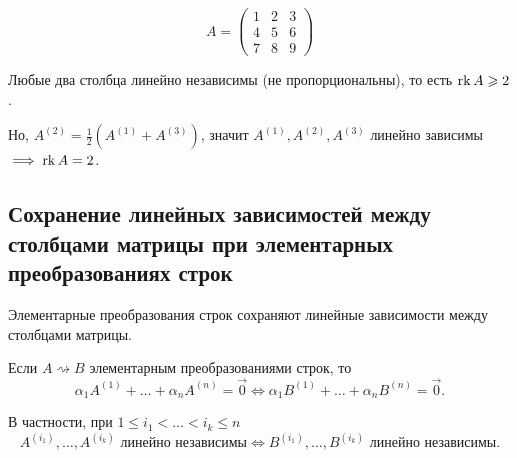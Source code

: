 \begin{example}
    \begin{equation*}
        A = \begin{pmatrix} 1 & 2 & 3 \\ 4 & 5 & 6 \\ 7 & 8 & 9 \end{pmatrix} 
    \end{equation*}
    
    Любые два столбца линейно независимы (не пропорциональны), то есть $\operatorname{\mathop{\mathrm{rk}}} A \geqslant 2$.

    Но, $A^{(2)} = \frac{1}{2}\left(A^{(1)} + A^{(3)}\right)$, значит $A^{(1)}, A^{(2)}, A^{(3)}$ линейно зависимы $\implies \operatorname{\mathop{\mathrm{rk}}} A = 2$.
\end{example}


\subsection{Сохранение линейных зависимостей между столбцами матрицы при элементарных преобразованиях строк}

\begin{proposal}
    Элементарные преобразования строк сохраняют линейные зависимости между столбцами матрицы.

    Если $A \rightsquigarrow B$ элементарным преобразованиями строк, то
    \begin{equation*}
        \alpha_1 A^{(1)} + \dots + \alpha_n A^{(n)} = \overrightarrow{0}
        \iff
        \alpha_1 B^{(1)} + \dots + \alpha_n B^{(n)} = \overrightarrow{0}
    .\end{equation*}

    В частности, при $1  \leq i_1 < \dots < i_k \leq n$
    \begin{equation*}
        A^{(i_1)}, \dots, A^{(i_k)} \text{ линейно независимы}
        \iff
        B^{(i_1)}, \dots, B^{(i_k)} \text{ линейно независимы}
    .\end{equation*}
\end{proposal}

